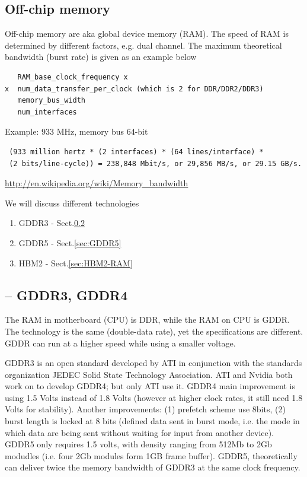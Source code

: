 \subsection{Off-chip memory}
\label{sec:chip-memory}

Off-chip memory are aka global device memory (RAM). The speed of RAM is
determined by different factors, e.g. dual channel. The maximum theoretical
bandwidth (burst rate) is given as an example below
\begin{verbatim}
   RAM_base_clock_frequency x 
x  num_data_transfer_per_clock (which is 2 for DDR/DDR2/DDR3)
   memory_bus_width 
   num_interfaces   
\end{verbatim}

Example: 933 MHz, memory bus 64-bit
\begin{verbatim}
 (933 million hertz * (2 interfaces) * (64 lines/interface) * 
 (2 bits/line-cycle)) = 238,848 Mbit/s, or 29,856 MB/s, or 29.15 GB/s. 
\end{verbatim}
\url{http://en.wikipedia.org/wiki/Memory_bandwidth}

We will discuss different technologies
\begin{enumerate}
  \item GDDR3 - Sect.\ref{sec:GDDR3}
  \item GDDR5 - Sect.\ref{sec:GDDR5}
  \item HBM2 - Sect.\ref{sec:HBM2-RAM}
\end{enumerate}

\subsection{-- GDDR3, GDDR4}
\label{sec:GDDR3}

The RAM in motherboard (CPU) is DDR, while the RAM on CPU is GDDR.
The technology is the same (double-data rate), yet the specifications are
different. GDDR can run at a higher speed while using a smaller voltage. 

GDDR3 is an open standard developed by ATI in conjunction with the standards
organization JEDEC Solid State Technology Association. ATI and Nvidia both work
on to develop GDDR4; but only ATI use it. GDDR4 main improvement is using 1.5
Volts instead of 1.8 Volts (however at higher clock rates, it still need 1.8
Volts for stability). Another improvements: (1) prefetch scheme use 8bits, (2)
burst length is locked at 8 bits (defined data sent in burst mode, i.e. the
mode in which data are being sent without waiting for input from another
device). GDDR5 only requires 1.5 volts, with density ranging from 512Mb to 2Gb
modudles (i.e. four 2Gb modules form 1GB frame buffer). GDDR5, theoretically can
deliver twice the memory bandwidth of GDDR3 at the same clock frequency.
 
